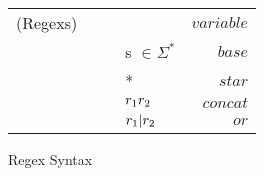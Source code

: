 \begin{figure}
\begin{tabular}{l@{\ }l@{\ }c@{\ }l@{\ }r}

(Regexs)& \Regex{} & \GEq{} & \UserDefined{} & $variable$ \\
& & & \GBar{} s $\in \Sigma^*$ & $base$ \\
& & & \GBar{} \Regex{}* & $star$ \\
& & & \GBar{} $r_1 r_2$ & $concat$ \\
& & & \GBar{} $r_1 | r_2$ & $or$ \\
\end{tabular}
\caption{Regex Syntax}
\label{fig:refn-subgrammars}
\end{figure}
